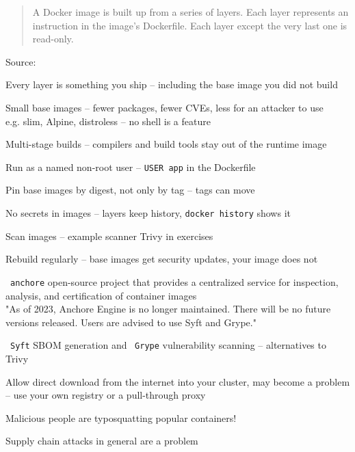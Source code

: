 \documentclass[Screen16to9,17pt]{foils}
\begin{document}


\begin{quote}
A Docker image is built up from a series of layers. Each layer represents an instruction in the image’s Dockerfile. Each layer except the very last one is read-only.
\end{quote}

Source: {\footnotesize
{}}

\begin{list2}
\item Every layer is something you ship -- including the base image you did not build
\end{list2}



\begin{list2}
\item Small base images -- fewer packages, fewer CVEs, less for an attacker to use\\
e.g. slim, Alpine, distroless -- no shell is a feature
\item Multi-stage builds -- compilers and build tools stay out of the runtime image
\item Run as a named non-root user -- \verb+USER app+ in the Dockerfile
\item Pin base images by digest, not only by tag -- tags can move
\item No secrets in images -- layers keep history, \verb+docker history+ shows it
\item Scan images -- example scanner Trivy in exercises
\item Rebuild regularly -- base images get security updates, your image does not
\end{list2}



\begin{list2}
\item \faWrench\ \verb+anchore+ open-source project that provides a centralized service for inspection, analysis, and certification of container images
\\
"As of 2023, Anchore Engine is no longer maintained. There will be no future versions released. Users are advised to use Syft and Grype."
\item \faWrench\ \verb+Syft+  SBOM generation and \faWrench\ \verb+Grype+  vulnerability scanning -- alternatives to Trivy
\item Allow direct download from the internet into your cluster, may become a problem\\
-- use your own registry or a pull-through proxy
\item Malicious people are typosquatting popular containers!
\item Supply chain attacks in general are a problem
\end{list2}
\end{document}

